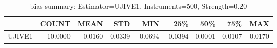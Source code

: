 \begin{table}[ht]
\centering
\caption{bias summary: Estimator=UJIVE1, Instruments=500, Strength=0.20}
\begin{tabular}{lrrrrrrrr}
\toprule
 & COUNT & MEAN & STD & MIN & 25\% & 50\% & 75\% & MAX \\
\midrule
UJIVE1 & 10.0000 & -0.0160 & 0.0339 & -0.0694 & -0.0394 & 0.0001 & 0.0107 & 0.0170 \\
\bottomrule
\end{tabular}
\end{table}
